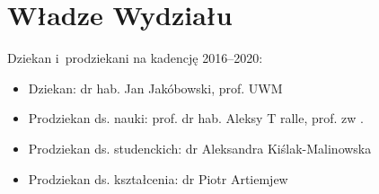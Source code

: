 \documentclass[a4paper,12pt]{article}
\begin{document}
\section{Władze Wydziału}
Dziekan i~prodziekani
 na kadencję 2016--2020:
\begin{itemize}
\item Dziekan: dr hab. Jan Jakóbowski, prof. UWM
\item Prodziekan ds. nauki: prof. dr hab. Aleksy T
ralle, prof. zw
.
\item Prodziekan ds. studenckich: dr Aleksandra Kiślak-Malinowska
\item Prodziekan ds. kształcenia: dr Piotr Artiemjew
\end{itemize}
\end{document}

